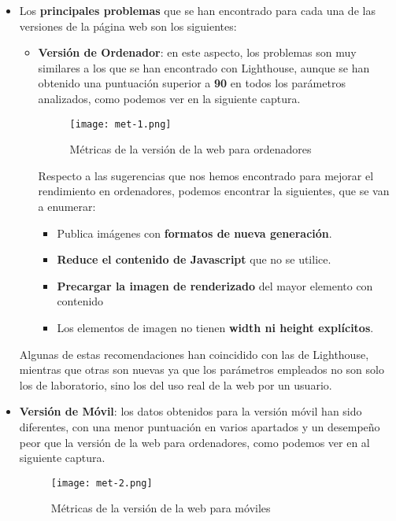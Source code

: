 \begin{itemize}
    \item Los \textbf{principales problemas} que se han encontrado para cada una de las versiones de la página web son los siguientes:

    \begin{itemize}
        \item \textbf{Versión de Ordenador}: en este aspecto, los problemas son muy similares a los que se han encontrado con Lighthouse, aunque se han obtenido una puntuación superior a \textbf{90} en todos los parámetros analizados, como podemos ver en la siguiente captura.

        \begin{figure}[H]
            \centering
            \texttt{[image: met-1.png]}
            \caption{Métricas de la versión de la web para ordenadores}
        \end{figure}

        Respecto a las sugerencias que nos hemos encontrado para mejorar el rendimiento en ordenadores, podemos encontrar la siguientes, que se van a enumerar:

        \begin{itemize}
            \item Publica imágenes con \textbf{formatos de nueva generación}.
            \item\textbf{Reduce el contenido de Javascript} que no se utilice.
            \item \textbf{Precargar la imagen de renderizado} del mayor elemento con contenido
            \item Los elementos de imagen no tienen \textbf{width ni height explícitos}.
        \end{itemize}
    \end{itemize}

    Algunas de estas recomendaciones han coincidido con las de Lighthouse, mientras que otras son nuevas ya que los parámetros empleados
    no son solo los de laboratorio, sino los del uso real de la web por un usuario.

    \item \textbf{Versión de Móvil}: los datos obtenidos para la versión móvil han sido diferentes, con una menor puntuación en varios apartados y un desempeño peor que la versión de la web para ordenadores, como podemos ver en al siguiente captura.

    \begin{figure}[H]
        \centering
        \texttt{[image: met-2.png]}
        \caption{Métricas de la versión de la web para móviles}
    \end{figure}


\end{itemize}
